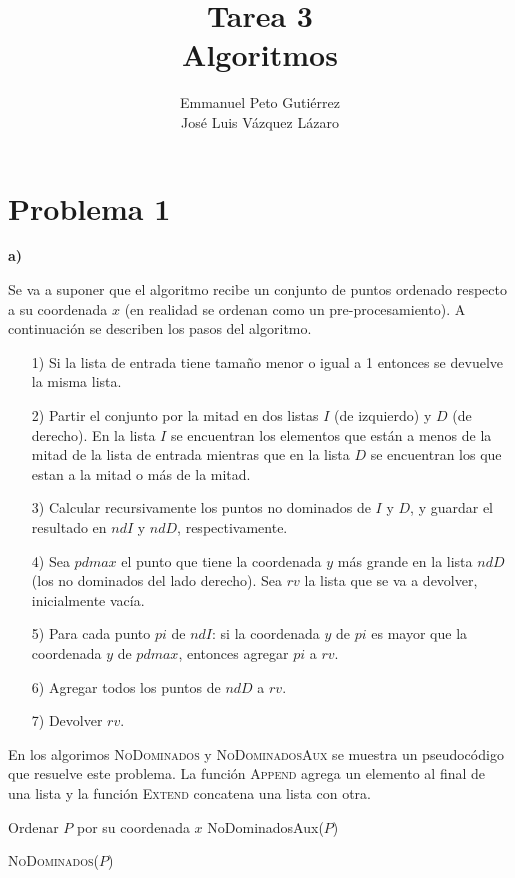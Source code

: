 \documentclass{article}
\title{Tarea 3\\Algoritmos}
\author{Emmanuel Peto Gutiérrez\\José Luis Vázquez Lázaro}
\begin{document}
\maketitle

\section*{Problema 1}

\textbf{a)}

Se va a suponer que el algoritmo recibe un conjunto de puntos ordenado respecto a su coordenada $x$ (en realidad se ordenan como un pre-procesamiento). A continuación se describen los pasos del algoritmo.

\begin{itemize}
\item[1)] Si la lista de entrada tiene tamaño menor o igual a 1 entonces se devuelve la misma lista.
\item[2)] Partir el conjunto por la mitad en dos listas $I$ (de izquierdo) y $D$ (de derecho). En la lista $I$ se encuentran los elementos que están a menos de la mitad de la lista de entrada mientras que en la lista $D$ se encuentran los que estan a la mitad o más de la mitad.
\item[3)] Calcular recursivamente los puntos no dominados de $I$ y $D$, y guardar el resultado en $ndI$ y $ndD$, respectivamente.
\item[4)] Sea $pdmax$ el punto que tiene la coordenada $y$ más grande en la lista $ndD$ (los no dominados del lado derecho). Sea $rv$ la lista que se va a devolver, inicialmente vacía.
\item[5)] Para cada punto $pi$ de $ndI$: si la coordenada $y$ de $pi$ es mayor que la coordenada $y$ de $pdmax$, entonces agregar $pi$ a $rv$.
\item[6)] Agregar todos los puntos de $ndD$ a $rv$.
\item[7)] Devolver $rv$.
\end{itemize}

En los algorimos \textsc{NoDominados} y \textsc{NoDominadosAux} se muestra un pseudocódigo que resuelve este problema. La función \textsc{Append} agrega un elemento al final de una lista y la función \textsc{Extend} concatena una lista con otra.

\begin{algorithm}[htbp]

Ordenar $P$ por su coordenada $x$\;
NoDominadosAux($P$)\;

\caption{\textsc{NoDominados($P$)}}

\end{algorithm}
\end{document}
